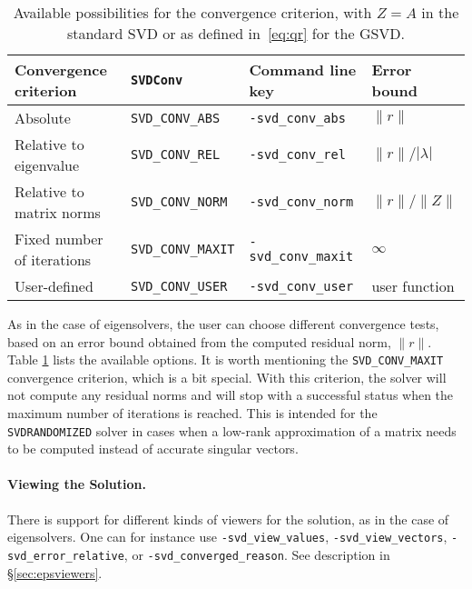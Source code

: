 \begin{table}
\centering
{\small \begin{tabular}{llll}
Convergence criterion      & \texttt{SVDConv}          & Command line key           & Error bound \\\hline
Absolute                   & \texttt{SVD\_CONV\_ABS}   & \texttt{-svd\_conv\_abs}   & $\|r\|$ \\
Relative to eigenvalue     & \texttt{SVD\_CONV\_REL}   & \texttt{-svd\_conv\_rel}   & $\|r\|/|\lambda|$ \\
Relative to matrix norms   & \texttt{SVD\_CONV\_NORM}  & \texttt{-svd\_conv\_norm}  & $\|r\|/\|Z\|$ \\
Fixed number of iterations & \texttt{SVD\_CONV\_MAXIT} & \texttt{-svd\_conv\_maxit} & $\infty$ \\
User-defined               & \texttt{SVD\_CONV\_USER}  & \texttt{-svd\_conv\_user}  & user function \\
\hline
\end{tabular} }
\caption{\label{tab:svdconvergence}Available possibilities for the convergence criterion, with $Z=A$ in the standard SVD or as defined in~\eqref{eq:qr} for the GSVD.}
\end{table}

As in the case of eigensolvers, the user can choose different convergence tests, based on an error bound obtained from the computed residual norm, $\|r\|$. Table \ref{tab:svdconvergence} lists the available options. It is worth mentioning the \texttt{SVD\_CONV\_MAXIT} convergence criterion, which is a bit special. With this criterion, the solver will not compute any residual norms and will stop with a successful status when the maximum number of iterations is reached. This is intended for the \texttt{SVDRANDOMIZED} solver in cases when a low-rank approximation of a matrix needs to be computed instead of accurate singular vectors.

\paragraph{Viewing the Solution.}

There is support for different kinds of viewers for the solution, as in the case of eigensolvers. One can for instance use \Verb!-svd_view_values!, \Verb!-svd_view_vectors!, \Verb!-svd_error_relative!, or \Verb!-svd_converged_reason!. See description in \S\ref{sec:epsviewers}.

